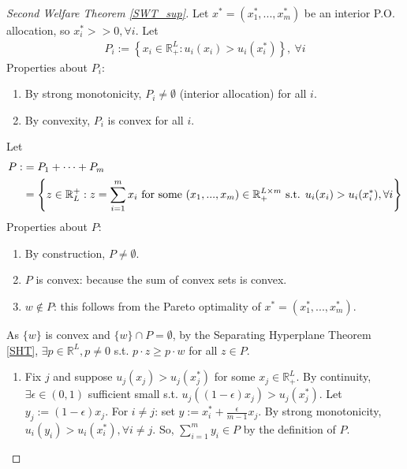 \documentclass[11pt]{elegantbook}
\begin{document}
\begin{proof}[Second Welfare Theorem \ref{SWT_sup}]
    Let $x^*=\left(x_1^*,...,x_m^*\right)$ be an interior P.O. allocation, so $x_i^*>>0, \forall i$. Let
    \begin{equation}
        \begin{aligned}
            P_i:=\left\{x_i\in \mathbb{R}_+^L:u_i(x_i)> u_i(x_i^*)\right\}, \ \forall i
        \end{aligned}
        \nonumber
    \end{equation}
    Properties about $P_i$:
    \begin{enumerate}[(1).]
        \item By strong monotonicity, $P_i\neq \emptyset$ (interior allocation) for all $i$.
        \item By convexity, $P_i$ is convex for all $i$.
    \end{enumerate}
    Let
    \begin{equation}
        \begin{aligned}
            P:&=P_1+\cdots+P_m\\
            &=\left\{z\in \mathbb{R}_L^+: z=\sum_{i=1}^m x_i \textnormal{ for some }(x_1,...,x_m)\in \mathbb{R}_+^{L\times m} \textnormal{ s.t. }u_i(x_i)> u_i(x_i^*), \forall i\right\}
        \end{aligned}
        \nonumber
    \end{equation}
    Properties about $P$:
    \begin{enumerate}[(1).]
        \item By construction, $P\neq \emptyset$.
        \item $P$ is convex: because the sum of convex sets is convex.
        \item $w\notin P$: this follows from the Pareto optimality of $x^*=\left(x_1^*,...,x_m^*\right)$.
    \end{enumerate}
    As $\{w\}$ is convex and $\{w\}\cap P=\emptyset$, by the Separating Hyperplane Theorem \ref{SHT}, $\exists p\in \mathbb{R}^L, p\neq 0$ s.t.  $p\cdot z\geq p\cdot w$ for all $z\in P$.
    \begin{enumerate}[$\circ$]
        \item
            \subitem Fix $j$ and suppose $u_j(x_j)>u_j(x_j^*)$ for some $x_j\in \mathbb{R}_+^L$. By continuity, $\exists \epsilon\in (0,1)$ sufficient small s.t. $u_j((1-\epsilon)x_j)>u_j(x_j^*)$. Let $y_j:=(1-\epsilon)x_j$. For $i\neq j$: set $y:=x_i^*+\frac{\epsilon}{m-1}x_j$. By strong monotonicity, $u_i(y_i)>u_i(x_i^*), \forall i\neq j$. So, $\sum_{i=1}^m y_i\in P$ by the definition of $P$.\\

\end{enumerate}
\end{proof}
\end{document}
